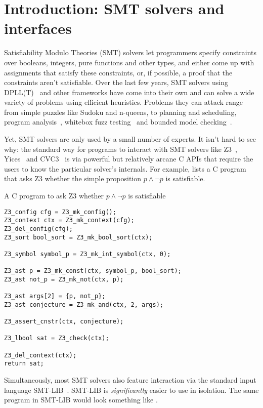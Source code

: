 \chapter{Introduction: SMT solvers and interfaces}
\label{sec:motiv}

Satisfiability Modulo Theories (SMT) solvers let programmers specify constraints
over booleans, integers, pure functions and other types, and either come up
with assignments that satisfy these constraints, or, if possible, a proof that
the constraints aren't satisfiable. Over the last few years, SMT solvers using
DPLL(T)~\cite{dpllt:04} and other frameworks have come into their own and can
solve a wide variety of problems using efficient heuristics. Problems they can
attack range from simple puzzles like Sudoku and n-queens, to planning and
scheduling, program analysis~\cite{Gulwani:08}, whitebox fuzz
testing~\cite{Godefroid:08} and bounded model checking~\cite{Armando:09}.

Yet, SMT solvers are only used by a small number of experts. It isn't hard to
see why: the standard way for programs to interact with SMT solvers like
Z3~\cite{z3}, Yices~\cite{yices} and CVC3~\cite{cvc3} is via powerful but
relatively arcane C APIs that require the users to know the particular
solver's internals. For example,  lists a C program that
asks Z3 whether the simple proposition $p \wedge \neg p$ is satisfiable.

\begin{program}
\caption{A C program to ask Z3 whether $p \wedge \neg p$ is satisfiable}
\label{fig:c-prop}
\begin{verbatim}
Z3_config cfg = Z3_mk_config();
Z3_context ctx = Z3_mk_context(cfg);
Z3_del_config(cfg);
Z3_sort bool_sort = Z3_mk_bool_sort(ctx);

Z3_symbol symbol_p = Z3_mk_int_symbol(ctx, 0);

Z3_ast p = Z3_mk_const(ctx, symbol_p, bool_sort);
Z3_ast not_p = Z3_mk_not(ctx, p);

Z3_ast args[2] = {p, not_p};
Z3_ast conjecture = Z3_mk_and(ctx, 2, args);

Z3_assert_cnstr(ctx, conjecture);

Z3_lbool sat = Z3_check(ctx);

Z3_del_context(ctx);
return sat;
\end{verbatim}
\end{program}

Simultaneously, most SMT solvers also feature interaction via the standard
input language SMT-LIB~\cite{smtlib2:10}. SMT-LIB is \textit{significantly}
easier to use in isolation. The same program in SMT-LIB would look something
like .

